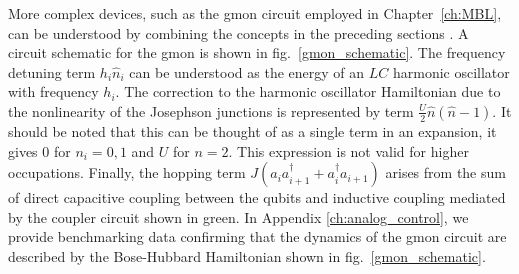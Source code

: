 More complex devices, such as the gmon circuit employed in Chapter~\ref{ch:MBL}, can be understood by combining the concepts in the preceding sections \cite{Neill2018}.
A circuit schematic for the gmon is shown in fig.~\ref{gmon_schematic}.
The frequency detuning term $h_i \hat{n}_i$ can be understood as the energy of an $LC$ harmonic oscillator with frequency $h_i$.
The correction to the harmonic oscillator Hamiltonian due to the nonlinearity of the Josephson junctions is represented by term $\frac{U}{2} \hat{n} (\hat{n}-1)$.
It should be noted that this can be thought of as a single term in an expansion, it gives $0$ for $n_i = 0, 1$ and $U$ for $n=2$.
This expression is not valid for higher occupations.
Finally, the hopping term $J (a_i a_{i+1}^\dagger + a_i^\dagger a_{i+1})$
arises from the sum of direct capacitive coupling between the qubits and inductive coupling mediated by the coupler circuit shown in green.
In Appendix \ref{ch:analog_control}, we provide benchmarking data confirming that the dynamics of the gmon circuit are described by the Bose-Hubbard Hamiltonian shown in fig.~\ref{gmon_schematic}.


